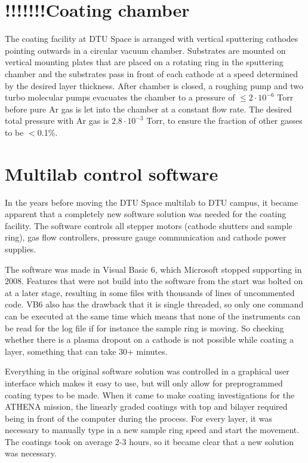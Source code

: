 \section{!!!!!!!Coating chamber}
The coating facility at DTU Space is arranged with vertical sputtering cathodes pointing outwards in a circular vacuum chamber. Substrates are mounted on vertical mounting plates that are placed on a rotating ring in the sputtering chamber and the substrates pass in front of each cathode at a speed determined by the desired layer thickness. After chamber is closed, a roughing pump and two turbo molecular pumps evacuates the chamber to a pressure of $\leq2\cdot10^{-6}$ Torr before pure Ar gas is let into the chamber at a constant flow rate. The desired total pressure with Ar gas is $2.8\cdot10^{-3}$ Torr, to ensure the fraction of other gasses to be $<$0.1\%.

\section{Multilab control software}\label{sec:ml_software}
In the years before moving the DTU Space multilab to DTU campus, it became apparent that a completely new software solution was needed for the coating facility. The software controls all stepper motors (cathode shutters and sample ring), gas flow controllers, pressure gauge communication and cathode power supplies.

The software was made in Visual Basic 6, which Microsoft stopped supporting in 2008. Features that were not build into the software from the start was bolted on at a later stage, resulting in some files with thousands of lines of uncommented code. VB6 also has the drawback that it is single threaded, so only one command can be executed at the same time which means that none of the instruments can be read for the log file if for instance the sample ring is moving. So checking whether there is a plasma dropout on a cathode is not possible while coating a layer, something that can take 30+ minutes.

Everything in the original software solution was controlled in a graphical user interface which makes it easy to use, but will only allow for preprogrammed coating types to be made. When it came to make coating investigations for the ATHENA mission, the linearly graded coatings with top and bilayer required being in front of the computer during the process. For every layer, it was necessary to manually type in a new sample ring speed and start the movement. The coatings took on average 2-3 hours, so it became clear that a new solution was necessary.

